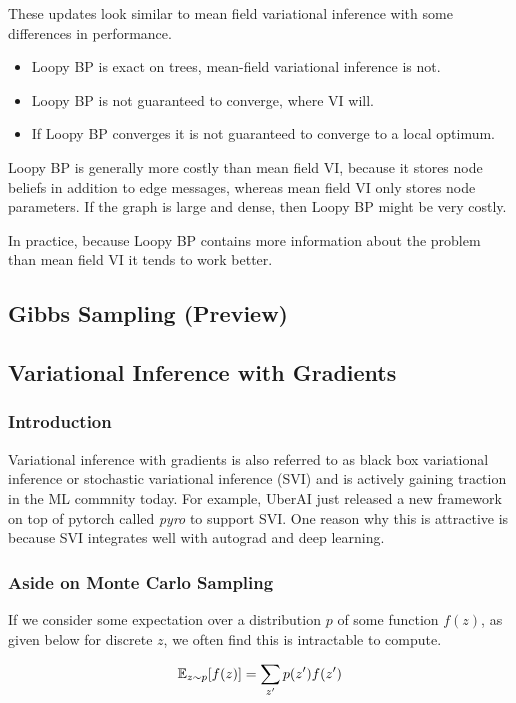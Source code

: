 \documentclass{article}
\begin{document}
These updates look similar to mean field variational inference with some differences in performance.
\begin{itemize}
	\item Loopy BP is exact on trees, mean-field variational inference is not.
	\item Loopy BP is not guaranteed to converge, where VI will.
	\item If Loopy BP converges it is not guaranteed to converge to a local optimum.
\end{itemize}
Loopy BP is generally more costly than mean field VI, because it stores node beliefs in addition to edge messages, whereas mean field VI only stores node parameters. If the graph is large and dense, then Loopy BP might be very costly. 

In practice, because Loopy BP contains more information about the problem than mean field VI it tends to work better.

\subsection{Gibbs Sampling (Preview)}

\subsection{Variational Inference with Gradients}

\subsubsection{Introduction}
Variational inference with gradients is also referred to as black box variational inference or stochastic variational inference (SVI) and is actively gaining traction in the ML commnity today.  
For example, UberAI just released a new framework on top of pytorch called \textit{pyro} to support SVI.  
One reason why this is attractive is because SVI integrates well with autograd and deep learning.


\subsubsection{Aside on Monte Carlo Sampling}

If we consider some expectation over a distribution $p$ of some function $f(z)$, as given below for discrete $z$, we often find this is intractable to compute.

$$
\mathbb{E}_{z \sim p}[f(z)] = \sum_{z'} p(z') f(z')
$$
\end{document}
